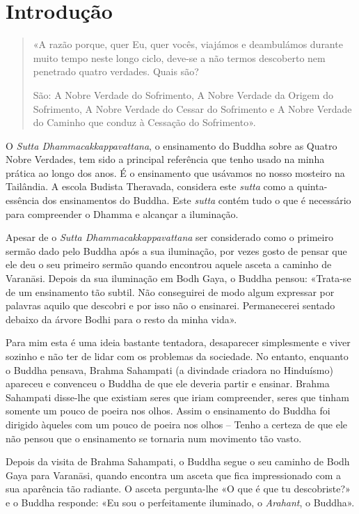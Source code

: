 \chapter{Introdução}

\begin{quote}
  «A razão porque, quer Eu, quer vocês, viajámos e deambulámos durante muito
  tempo neste longo ciclo, deve-se a não termos descoberto nem penetrado quatro
  verdades. Quais são?

  São: A Nobre Verdade do Sofrimento, A Nobre Verdade da Origem do Sofrimento, A
  Nobre Verdade do Cessar do Sofrimento e A Nobre Verdade do Caminho que conduz
  à Cessação do Sofrimento».

\end{quote}

O \emph{Sutta Dhammacakkappavattana}, o ensinamento do Buddha sobre as Quatro
Nobre Verdades, tem sido a principal referência que tenho usado na minha prática
ao longo dos anos. É o ensinamento que usávamos no nosso mosteiro na Tailândia.
A escola Budista Theravada, considera este \emph{sutta} como a quinta-essência
dos ensinamentos do Buddha. Este \emph{sutta} contém tudo o que é necessário
para compreender o Dhamma e alcançar a iluminação.

Apesar de o \emph{Sutta Dhammacakkappavattana} ser considerado como o primeiro
sermão dado pelo Buddha após a sua iluminação, por vezes gosto de pensar que ele
deu o seu primeiro sermão quando encontrou aquele asceta a caminho de Varanāsi.
Depois da sua iluminação em Bodh Gaya, o Buddha pensou: «Trata-se de um
ensinamento tão subtil. Não conseguirei de modo algum expressar por palavras
aquilo que descobri e por isso não o ensinarei. Permanecerei sentado debaixo da
árvore Bodhi para o resto da minha vida».

Para mim esta é uma ideia bastante tentadora, desaparecer simplesmente e viver
sozinho e não ter de lidar com os problemas da sociedade. No entanto, enquanto o
Buddha pensava, Brahma Sahampati (a divindade criadora no Hinduísmo) apareceu e
convenceu o Buddha de que ele deveria partir e ensinar. Brahma Sahampati
disse-lhe que existiam seres que iriam compreender, seres que tinham somente um pouco
de poeira nos olhos. Assim o ensinamento do Buddha foi dirigido àqueles com um
pouco de poeira nos olhos – Tenho a certeza de que ele não pensou que o
ensinamento se tornaria num movimento tão vasto.

Depois da visita de Brahma Sahampati, o Buddha segue o seu caminho de Bodh Gaya
para Varanāsi, quando encontra um asceta que fica impressionado com a sua
aparência tão radiante. O asceta pergunta-lhe «O que é que tu descobriste?» e o
Buddha responde: «Eu sou o perfeitamente iluminado, o \emph{Arahant}, o Buddha».

